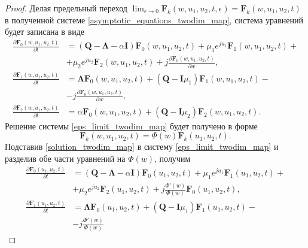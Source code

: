 \begin{proof}
	Делая предельный переход $ \lim_{\epsilon \xrightarrow{} 0}\boldsymbol{F}_{k}(w,u_{1},u_{2},t,\epsilon) = \boldsymbol{F}_{k}(w,u_{1},u_{2},t)$  в полученной системе \eqref{asymptotic_equations_twodim_map}, система уравнений будет записана в виде
	\begin{equation} \label{eps_limit_twodim_map}
		\begin{split}
			\frac{{\partial \boldsymbol{F}_{0}(w,u_{1},u_{2},t)}}{{\partial t}} &= (\boldsymbol{Q}-\boldsymbol{\Lambda}-\alpha\boldsymbol{I})\boldsymbol{F}_{0}(w,u_{1},u_{2},t) + \mu_{1} e^{ju_{1}}\boldsymbol{F}_{1}(w,u_{1},u_{2},t)  + \\  &+ \mu_{2}e^{ju_{2}}\boldsymbol{F}_{2}(w,u_{1},u_{2},t) + j
			\frac{{\partial \boldsymbol{F}_{0}(w,u_{1},u_{2},t)}}{{\partial w}},
			\\
			\frac{{\partial \boldsymbol{F}_{1}(w,u_{1},u_{2},t)}}{{\partial t}} &= \boldsymbol{\Lambda} \boldsymbol{F}_{0}(w,u_{1},u_{2},t) +  (\boldsymbol{Q} - \boldsymbol{I}\mu_{1})\boldsymbol{F}_{1}(w,u_{1},u_{2},t) -\\ &- j
			\frac{{\partial \boldsymbol{F}_{0}(w,u_{1},u_{2},t)}}{{\partial w}},
			\\
			\frac{{\partial \boldsymbol{F}_{2}(w,u_{1},u_{2},t)}}{{\partial t}} &= \alpha \boldsymbol{F}_{0}(w,u_{1},u_{2},t) + (\boldsymbol{Q} - \boldsymbol{I}\mu_{2})\boldsymbol{F}_{2}(w,u_{1},u_{2},t).
		\end{split}
	\end{equation}   
	Решение системы \eqref{eps_limit_twodim_map} будет получено в форме
	\begin{equation} \label{solution_twodim_map}
		\boldsymbol{F}_{k}(w,u_{1},u_{2},t) = \Phi(w)\boldsymbol{F}_{k}(u_{1},u_{2},t).
	\end{equation}  
	Подставив \eqref{solution_twodim_map} в систему \eqref{eps_limit_twodim_map} и разделив обе части уравнений на $\Phi(w)$, получим
	\begin{equation} \label{preresult_twodim_map}
	\begin{split}
		\frac{{\partial \boldsymbol{F}_{0}(u_{1},u_{2},t)}}{{\partial t}} &= (\boldsymbol{Q}-\boldsymbol{\Lambda}-\alpha\boldsymbol{I})\boldsymbol{F}_{0}(u_{1},u_{2},t) + \mu_{1} e^{ju_{1}}\boldsymbol{F}_{1}(u_{1},u_{2},t)  + \\  &+ \mu_{2}e^{ju_{2}}\boldsymbol{F}_{2}(u_{1},u_{2},t) + j\frac{\Phi'(w) }{\Phi(w)}
		 \boldsymbol{F}_{0}(u_{1},u_{2},t),
		\\
		\frac{{\partial \boldsymbol{F}_{1}(u_{1},u_{2},t)}}{{\partial t}} &= \boldsymbol{\Lambda} \boldsymbol{F}_{0}(u_{1},u_{2},t) +  (\boldsymbol{Q} - \boldsymbol{I}\mu_{1})\boldsymbol{F}_{1}(u_{1},u_{2},t) -\\ &- j\frac{\Phi'(w) }{\Phi(w)}

\end{split}
\end{equation}
\end{proof}
